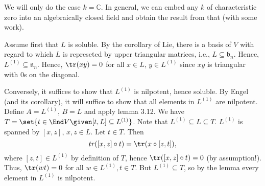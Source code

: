 We will only do the case $k = \mathbb{C}$. In general, we can embed any $k$ of
characteristic zero into an algebraically closed field and obtain the result from
that (with some work).

Assume first that $L$ is soluble. By the corollary of Lie, there is a basis of
$V$ with regard to which $L$ is represeted by upper triangular matrices, i.e.,
$L \subseteq \mathfrak{b}_n$. Hence, $L^{(1)} \subseteq \mathfrak{n}_n$. Hence,
$\tr(xy) = 0$ for all $x \in L$, $y \in L^{(1)}$ since $xy$ is triangular with
$0$s on the diagonal.

Conversely, it suffices to show that $L^{(1)}$ is nilpotent, hence soluble.
By Engel (and its corollary), it will suffice to show that all elements in
$L^{(1)}$ are nilpotent. Define $A = L^{(1)}$, $B = L$ and apply lemma 3.12.
We have $T = \set{t \in \End V\given [t, L] \subseteq L^{(1)}}$. Note
that $L^{(1)} \subseteq L \subseteq T$.
$L^{(1)}$ is spanned by $[x, z]$,  $x, z \in L$. Let $t \in T$. Then
\[ tr([x, z] \circ t) = \tr(x \circ [z, t]),\]
where $[z, t] \in L^{(1)}$ by definition of $T$, hence $\tr([x, z] \circ t) = 0$ (by assumption!).
Thus, $\tr(wt) = 0$ for all $w \in L^{(1)}, t \in T$. But $L^{(1)} \subseteq T$,
so by the lemma every element in $L^{(1)}$ is nilpotent.
